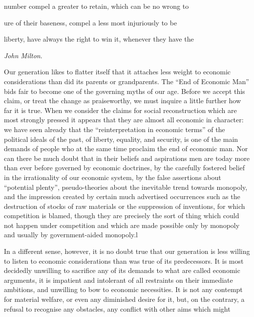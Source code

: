 \documentclass[11pt,openany]{book}
\begin{document}
number compel a greater to retain, which can be no wrong to

ure of their baseness, compel a less most injuriously to be

liberty, have always the right to win it, whenever they have the

\emph{John Milton}.

Our generation likes to flatter itself that it attaches less weight to economic considerations than did its parents or grandparents. The ``End of Economic Man'' bids fair to become one of the governing myths of our age. Before we accept this claim, or treat the change as praiseworthy, we must inquire a little further how far it is true. When we consider the claims for social reconstruction which are most strongly pressed it appears that they are almost all economic in character: we have seen already that the ``reinterpretation in economic terms'' of the political ideals of the past, of liberty, equality, and security, is one of the main demands of people who at the same time proclaim the end of economic man. Nor can there be much doubt that in their beliefs and aspirations men are today more than ever before governed by economic doctrines, by the carefully fostered belief in the irrationality of our economic system, by the false assertions about ``potential plenty'', pseudo-theories about the inevitable trend towards monopoly, and the impression created by certain much advertised occurrences such as the destruction of stocks of raw materials or the suppression of inventions, for which competition is blamed, though they are precisely the sort of thing which could not happen under competition and which are made possible only by monopoly and usually by government-aided monopoly.l

In a different sense, however, it is no doubt true that our generation is less willing to listen to economic considerations than was true of its predecessors. It is most decidedly unwilling to sacrifice any of its demands to what are called economic arguments, it is impatient and intolerant of all restraints on their immediate ambitions, and unwilling to bow to economic necessities. It is not any contempt for material welfare, or even any diminished desire for it, but, on the contrary, a refusal to recognise any obstacles, any conflict with other aims which might
\end{document}
